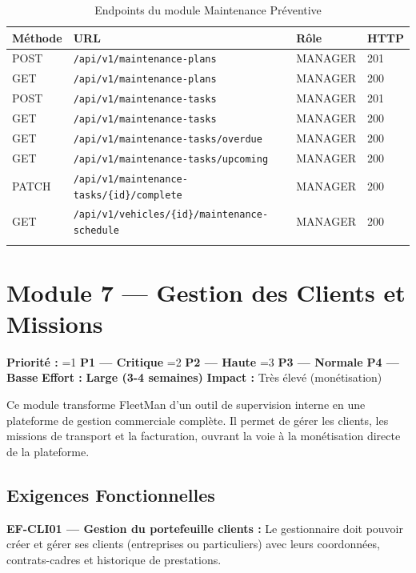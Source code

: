 \documentclass[12pt,a4paper]{report}
\newcommand{\prio}[1]{%
  \ifnum#1=1 \textcolor{fleeterror}{\textbf{P1 — Critique}}%
  \else\ifnum#1=2 \textcolor{fleetwarning}{\textbf{P2 — Haute}}%
  \else\ifnum#1=3 \textcolor{fleetsuccess}{\textbf{P3 — Normale}}%
  \else \textcolor{fleetgray}{\textbf{P4 — Basse}}%
  \fi\fi\fi}
\newcommand{\effort}[1]{\textcolor{fleetpurple}{\textbf{#1}}}
\begin{document}
\begin{longtable}{p{1.5cm}p{7cm}p{2.5cm}p{1.5cm}}
\toprule
\textbf{Méthode} & \textbf{URL} & \textbf{Rôle} & \textbf{HTTP} \\
\midrule
\endhead
POST & \texttt{/api/v1/maintenance-plans} & MANAGER & 201 \\
GET & \texttt{/api/v1/maintenance-plans} & MANAGER & 200 \\
POST & \texttt{/api/v1/maintenance-tasks} & MANAGER & 201 \\
GET & \texttt{/api/v1/maintenance-tasks} & MANAGER & 200 \\
GET & \texttt{/api/v1/maintenance-tasks/overdue} & MANAGER & 200 \\
GET & \texttt{/api/v1/maintenance-tasks/upcoming} & MANAGER & 200 \\
PATCH & \texttt{/api/v1/maintenance-tasks/\{id\}/complete} & MANAGER & 200 \\
GET & \texttt{/api/v1/vehicles/\{id\}/maintenance-schedule} & MANAGER & 200 \\
\bottomrule
\caption{Endpoints du module Maintenance Préventive}
\end{longtable}

\chapter{Module 7 — Gestion des Clients et Missions}

\begin{tcolorbox}[colback=fleetsuccess!5, colframe=fleetsuccess, title={\bfseries Résumé du Module}, fonttitle=\color{white}]
\textbf{Priorité :} \prio{3} \quad \textbf{Effort :} \effort{Large (3-4 semaines)} \quad \textbf{Impact :} Très élevé (monétisation)

Ce module transforme FleetMan d'un outil de supervision interne en une plateforme de gestion commerciale complète. Il permet de gérer les clients, les missions de transport et la facturation, ouvrant la voie à la monétisation directe de la plateforme.
\end{tcolorbox}

\section{Exigences Fonctionnelles}

\begin{reqbox}
\textbf{EF-CLI01 — Gestion du portefeuille clients :} Le gestionnaire doit pouvoir créer et gérer ses clients (entreprises ou particuliers) avec leurs coordonnées, contrats-cadres et historique de prestations.
\end{reqbox}
\end{document}
